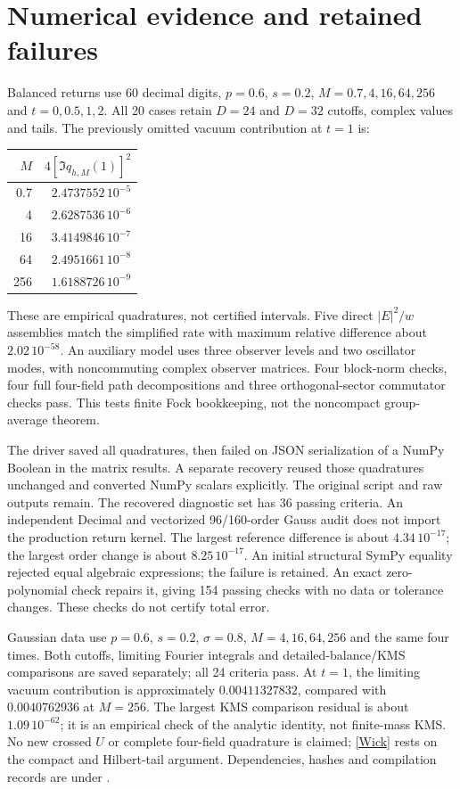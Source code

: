 \documentclass[11pt,a4paper]{article}
\begin{document}
\newpage
\section{Numerical evidence and retained failures}
Balanced returns use 60 decimal digits, $p=0.6$, $s=0.2$,
$M=0.7,4,16,64,256$ and $t=0,0.5,1,2$.
All 20 cases retain $D=24$ and $D=32$ cutoffs, complex values and tails.
The previously omitted vacuum contribution at $t=1$ is:
\begin{center}
\begin{tabular}{rr}
\toprule
$M$ & $4[\Im q_{h,M}(1)]^2$\\
\midrule
0.7 & $2.4737552\,10^{-5}$\\
4 & $2.6287536\,10^{-6}$\\
16 & $3.4149846\,10^{-7}$\\
64 & $2.4951661\,10^{-8}$\\
256 & $1.6188726\,10^{-9}$\\
\bottomrule
\end{tabular}
\end{center}
These are empirical quadratures, not certified intervals.
Five direct $|E|^2/w$ assemblies match the simplified rate with maximum
relative difference about $2.02\,10^{-58}$.
An auxiliary model uses three observer levels and two oscillator modes,
with noncommuting complex observer matrices. Four block-norm checks,
four full four-field path decompositions and three orthogonal-sector
commutator checks pass. This tests finite Fock bookkeeping, not the
noncompact group-average theorem.

The driver saved all quadratures, then failed on JSON serialization
of a NumPy Boolean in the matrix results. A separate recovery reused
those quadratures unchanged and converted NumPy scalars explicitly.
The original script and raw outputs remain. The recovered diagnostic
set has 36 passing criteria.
An independent Decimal and vectorized 96/160-order Gauss audit does
not import the production return kernel. The largest reference
difference is about $4.34\,10^{-17}$; the largest order change is
about $8.25\,10^{-17}$. An initial structural SymPy equality rejected
equal algebraic expressions; the failure is retained. An exact
zero-polynomial check repairs it, giving 154 passing checks with no
data or tolerance changes. These checks do not certify total error.

Gaussian data use $p=0.6$, $s=0.2$, $\sigma=0.8$,
$M=4,16,64,256$ and the same four times.
Both cutoffs, limiting Fourier integrals and detailed-balance/KMS
comparisons are saved separately; all 24 criteria pass.
At $t=1$, the limiting vacuum contribution is approximately
$0.00411327832$, compared with $0.0040762936$ at $M=256$.
The largest KMS comparison residual is about $1.09\,10^{-62}$;
it is an empirical check of the analytic identity, not finite-mass KMS.
No new crossed $U$ or complete
four-field quadrature is claimed; \eqref{Wick} rests on the compact
and Hilbert-tail argument.
Dependencies, hashes and compilation records are under
.
\end{document}
